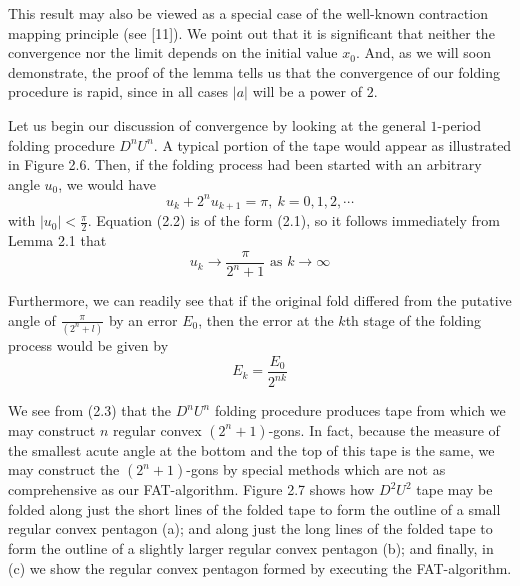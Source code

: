 This result may also be viewed as a special case of the well-known contraction mapping principle (see [11]). We point out that it is significant that neither the convergence nor the limit depends on the initial value $x_{0}$. And, as we will soon demonstrate, the proof of the lemma tells us that the convergence of our folding procedure is rapid, since in all cases $|a|$ will be a power of $2$.

Let us begin our discussion of convergence by looking at the general $1$-period folding procedure $D^{n} U^{n}$. A typical portion of the tape would appear as illustrated in Figure 2.6. Then, if the folding process had been started with an arbitrary angle $u_{0}$, we would have
\begin{equation}
u_{k} + 2^{n} u_{k+1} = \pi,\ k = 0,1,2,\cdots  \tag{2.2}
\end{equation}
with $|u_{0}| < \frac{\pi}{2}$. Equation (2.2) is of the form (2.1), so it follows immediately from Lemma 2.1 that
\begin{equation}
u_{k} \to \frac{\pi}{2^{n}+1} \text{ as } k \to \infty  \tag{2.3}
\end{equation}

Furthermore, we can readily see that if the original fold differed from the putative angle of $\frac{\pi}{(2^{n}+l)}$ by an error $E_{0}$, then the error at the $k$th stage of the folding process would be given by
\begin{equation*}
E_{k} = \frac{E_{0}}{2^{nk}}
\end{equation*}

We see from (2.3) that the $D^{n} U^{n}$ folding procedure produces tape from which we may construct $n$ regular convex $(2^{n}+1)$-gons. In fact, because the measure of the smallest acute angle at the bottom and the top of this tape is the same, we may construct the $(2^{n}+1)$-gons by special methods which are not as comprehensive as our FAT-algorithm. Figure 2.7 shows how $D^{2} U^{2}$ tape may be folded along just the short lines of the folded tape to form the outline of a small regular convex pentagon (a); and along just the long lines of the folded tape to form the outline of a slightly larger regular convex pentagon (b); and finally, in (c) we show the regular convex pentagon formed by executing the FAT-algorithm. 

